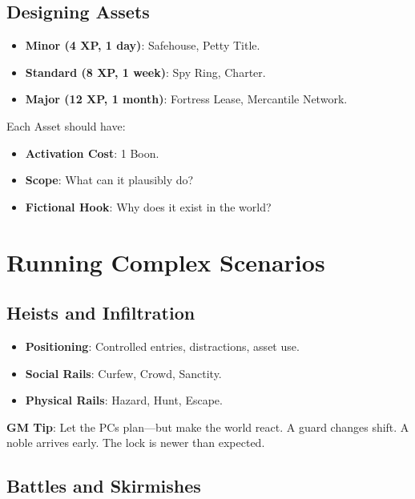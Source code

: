\subsection*{Designing Assets}

\begin{itemize}
    \item \textbf{Minor (4 XP, 1 day)}: Safehouse, Petty Title.
    \item \textbf{Standard (8 XP, 1 week)}: Spy Ring, Charter.
    \item \textbf{Major (12 XP, 1 month)}: Fortress Lease, Mercantile Network.
\end{itemize}

Each Asset should have:
\begin{itemize}
    \item \textbf{Activation Cost}: 1 Boon.
    \item \textbf{Scope}: What can it plausibly do?
    \item \textbf{Fictional Hook}: Why does it exist in the world?
\end{itemize}

\section*{Running Complex Scenarios}

\subsection*{Heists and Infiltration}

\begin{itemize}
    \item \textbf{Positioning}: Controlled entries, distractions, asset use.
    \item \textbf{Social Rails}: Curfew, Crowd, Sanctity.
    \item \textbf{Physical Rails}: Hazard, Hunt, Escape.
\end{itemize}

\textbf{GM Tip}: Let the PCs plan---but make the world react. A guard changes shift. A noble arrives early. The lock is newer than expected.

\subsection*{Battles and Skirmishes}

